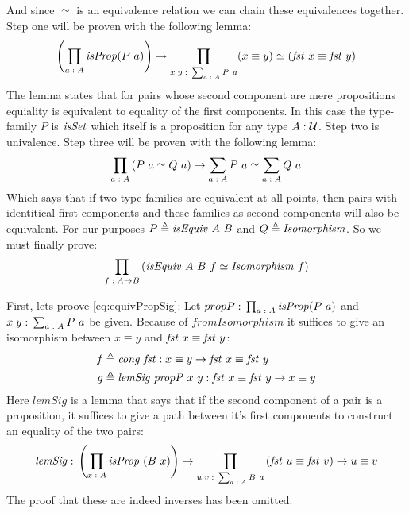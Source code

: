 And since $\simeq$ is an equivalence relation we can chain these equivalences
together. Step one will be proven with the following lemma:
%
\begin{align}
  \label{eq:equivPropSig}
\left(\prod_{a \;\mathord{:}\; A} \mathit{isProp} (P\ a)\right) \to \prod_{x\;y \;\mathord{:}\; \sum_{a \;\mathord{:}\; A} P\ a} (x \equiv y) \simeq (\mathit{fst}\ x \equiv \mathit{fst}\ y)
\end{align}
%
The lemma states that for pairs whose second component are mere propositions
equiality is equivalent to equality of the first components. In this case the
type-family $P$ is $\mathit{isSet}$ which itself is a proposition for any type $A \;\mathord{:}\;
\mathcal{U}$. Step two is univalence. Step three will be proven with the following
lemma:
%
\begin{align}
  \label{eq:equivSig}
\prod_{a \;\mathord{:}\; A} \left( P\ a \simeq Q\ a \right) \to \sum_{a \;\mathord{:}\; A} P\ a \simeq \sum_{a \;\mathord{:}\; A} Q\ a
\end{align}
%
Which says that if two type-families are equivalent at all points, then pairs
with identitical first components and these families as second components will
also be equivalent. For our purposes $P \triangleq \mathit{isEquiv}\ A\ B$ and $Q \triangleq
\mathit{Isomorphism}$. So we must finally prove:
%
\begin{align}
  \label{eq:equivIso}
\prod_{f \;\mathord{:}\; A \to B} \left( \mathit{isEquiv}\ A\ B\ f \simeq \mathit{Isomorphism}\ f \right)
\end{align}

First, lets proove \ref{eq:equivPropSig}: Let $propP \;\mathord{:}\; \prod_{a \;\mathord{:}\; A} \mathit{isProp} (P\ a)$ and $x\;y \;\mathord{:}\; \sum_{a \;\mathord{:}\; A} P\ a$ be given. Because
of $\mathit{fromIsomorphism}$ it suffices to give an isomorphism between
$x \equiv y$ and $\mathit{fst}\ x \equiv \mathit{fst}\ y$:
%
\begin{align*}
  f & \triangleq \mathit{cong}\ \mathit{fst} \;\mathord{:}\; x \equiv y \to \mathit{fst}\ x \equiv \mathit{fst}\ y \\
  g & \triangleq \mathit{lemSig}\ \mathit{propP}\ x\ y \;\mathord{:}\; \mathit{fst}\ x \equiv \mathit{fst}\ y \to x \equiv y
\end{align*}
%
Here $\mathit{lemSig}$ is a lemma that says that if the second component of a
pair is a proposition, it suffices to give a path between it's first components
to construct an equality of the two pairs:
%
\begin{align*}
\mathit{lemSig} \;\mathord{:}\; \left( \prod_{x \;\mathord{:}\; A} \mathit{isProp}\ (B\ x) \right) \to
\prod_{u\; v \;\mathord{:}\; \sum_{a \;\mathord{:}\; A} B\ a}
  \left( \mathit{fst}\ u \equiv \mathit{fst}\ v \right) \to u \equiv v
\end{align*}
%
The proof that these are indeed inverses has been omitted. \QED


